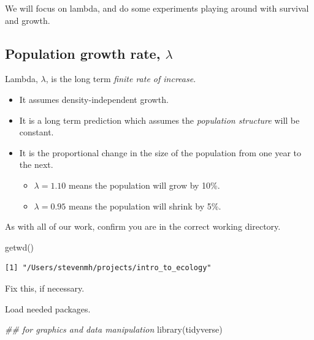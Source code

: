 \documentclass[
  letterpaper,
  DIV=11,
  numbers=noendperiod]{scrreprt}
\newenvironment{Shaded}{\begin{snugshade}}{\end{snugshade}}
\newcommand{\DocumentationTok}[1]{\textcolor[rgb]{0.37,0.37,0.37}{\textit{#1}}}
\newcommand{\FunctionTok}[1]{\textcolor[rgb]{0.28,0.35,0.67}{#1}}
\newcommand{\NormalTok}[1]{\textcolor[rgb]{0.00,0.23,0.31}{#1}}
\providecommand{\tightlist}{%
  \setlength{\itemsep}{0pt}\setlength{\parskip}{0pt}}
\begin{document}
We will focus on lambda, and do some experiments playing around with
survival and growth.

\subsection{\texorpdfstring{Population growth rate,
\(\lambda\)}{Population growth rate, \textbackslash lambda}}\label{population-growth-rate-lambda}

Lambda, \(\lambda\), is the long term \emph{finite rate of increase}.

\begin{itemize}
\tightlist
\item
  It assumes density-independent growth.
\item
  It is a long term prediction which assumes the \emph{population
  structure} will be constant.
\item
  It is the proportional change in the size of the population from one
  year to the next.

  \begin{itemize}
  \tightlist
  \item
    \(\lambda = 1.10\) means the population will grow by 10\%.
  \item
    \(\lambda = 0.95\) means the population will shrink by 5\%.
  \end{itemize}
\end{itemize}

As with all of our work, confirm you are in the correct working
directory.

\begin{Shaded}
\begin{Highlighting}[]
\FunctionTok{getwd}\NormalTok{()}
\end{Highlighting}
\end{Shaded}

\begin{verbatim}
[1] "/Users/stevenmh/projects/intro_to_ecology"
\end{verbatim}

Fix this, if necessary.

Load needed packages.

\begin{Shaded}
\begin{Highlighting}[]
\DocumentationTok{\#\# for graphics and data manipulation}
\FunctionTok{library}\NormalTok{(tidyverse)}
\end{Highlighting}
\end{Shaded}
\end{document}

